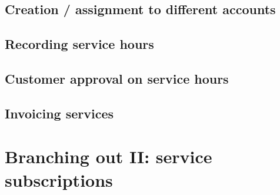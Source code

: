 \section{Creation / assignment to different accounts}
\label{sec-starting-services-assignment}

\section{Recording service hours}
\label{sec-starting-services-writing-hours}

\section{Customer approval on service hours}
\label{sec-starting-services-hours-customer-approval}

\section{Invoicing services}
\label{sec-starting-services-invoicing}

\chapter{Branching out II: service subscriptions}
\label{cha-starting-services-subscriptions}


